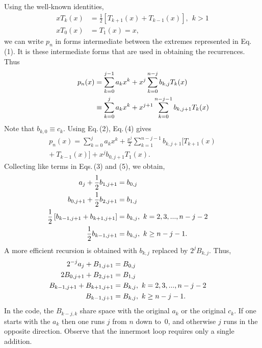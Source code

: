 \documentclass[twoside]{MATH77}
\begin{document}
Using the well-known identities,
\begin{equation}
\label{O2}
\begin{split}
xT_k(x)&=\frac 12\left[ T_{k+1}(x)+T_{k-1}(x)\right],\ \ k>1\\
xT_0(x)&=T_1(x)=x,
\end{split}
\end{equation}
we can write $p_n$ in forms intermediate between the extremes represented
in Eq.\,(1). It is these intermediate forms that are used in obtaining the
recurrences. Thus
\begin{align}
\label{O3}
p_n(x) &=\sum_{k=0}^{j-1}a_kx^k+x^j\sum_{k=0}^{n-j}b_{k,j}T_k(x)\\
\label{04}
 &\equiv \sum_{k=0}^ja_kx^k+x^{j+1}\sum_{k=0}^{n-j-1}b_{k,j+1}T_k(x)
\hspace{-1in}
\end{align}
Note that $b_{k,0}\equiv c_k$. Using Eq.\,(2), Eq.\,(4) gives
\begin{multline}
\label{O5}
p_n(x)=\sum_{k=0}^{j}a_kx^k+\frac{x^j}2 \sum_{k=1}^{n-j-1}
b_{k,j+1}\bigl [ T_{k+1}(x)\\
+\ T_{k-1}(x)\bigr ]+x^jb_{0,j+1}T_1(x).
\end{multline}
Collecting like terms in Eqs.\,(3) and (5), we obtain,
\begin{equation}\label{O6}
\hspace{-15pt}\begin{split}
a_j+\frac 12b_{1,j+1} &= b_{0,j}\\
b_{0,j+1}+\frac 12 b_{2,j+1} &=b_{1,j}\\
\frac 12\left[ b_{k-1,j+1}+b_{k+1,j+1}\right] &=
b_{k,j},\ k=2,3,...,n-j-2\\
\frac 12b_{k-1,j+1} &= b_{k,j},\ k\geq n-j-1.
\end{split}
\end{equation}
A more efficient recursion is obtained with $b_{k,j}$ replaced by
$2^jB_{k,j}$. Thus,
\begin{equation}\label{O7}
\hspace{-15pt}\begin{split}
2^{-j}a_j+B_{1,j+1} &= B_{0,j}\\
2 B_{0,j+1}+B_{2,j+1} &= B_{1,j}\\
B_{k-1,j+1}+B_{k+1,j+1} &= B_{k,j},\ k=2,3,...,n-j-2\\
B_{k-1,j+1} &= B_{k,j}, \ k\geq n-j-1.
\end{split}
\end{equation}
In the code, the $B_{k-j,k}$ share space with the original $a_k$ or the
original $c_k$. If one starts with the $a_k$ then one runs $j$ from $n$ down
to~0, and otherwise $j$ runs in the opposite direction. Observe that the
innermost loop requires only a single addition.
\end{document}
